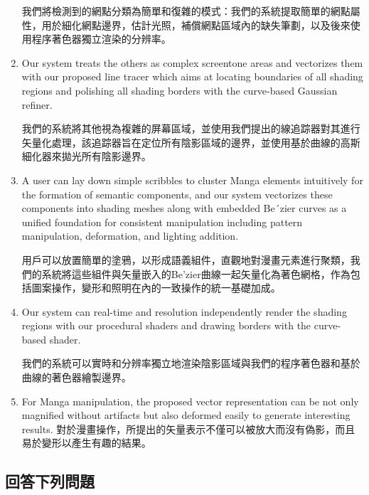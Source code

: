 \begin{enumerate}
我們將檢測到的網點分類為簡單和復雜的模式：我們的系統提取簡單的網點屬性，用於細化網點邊界，估計光照，補償網點區域內的缺失筆劃，以及後來使用程序著色器獨立渲染的分辨率。


\item Our system treats the others as complex screentone areas and vectorizes them with our proposed line tracer which aims at locating boundaries of all shading regions and polishing all shading borders with the curve-based Gaussian refiner.

我們的系統將其他視為複雜的屏幕區域，並使用我們提出的線追踪器對其進行矢量化處理，該追踪器旨在定位所有陰影區域的邊界，並使用基於曲線的高斯細化器來拋光所有陰影邊界。


\item A user can lay down simple scribbles to cluster Manga elements intuitively for the formation of semantic components, and our system vectorizes these components into shading meshes along with embedded Be´zier curves as a unified foundation for consistent manipulation including pattern manipulation, deformation, and lighting addition.

用戶可以放置簡單的塗鴉，以形成語義組件，直觀地對漫畫元素進行聚類，我們的系統將這些組件與矢量嵌入的Be'zier曲線一起矢量化為著色網格，作為包括圖案操作，變形和照明在內的一致操作的統一基礎加成。


\item Our system can real-time and resolution independently render the shading regions with our procedural shaders and drawing borders with the curve-based shader.

我們的系統可以實時和分辨率獨立地渲染陰影區域與我們的程序著色器和基於曲線的著色器繪製邊界。


\item For Manga manipulation, the proposed vector representation can be not only magnified without artifacts but also deformed easily to generate interesting results.
對於漫畫操作，所提出的矢量表示不僅可以被放大而沒有偽影，而且易於變形以產生有趣的結果。


\end{enumerate}



\subsection{回答下列問題}

